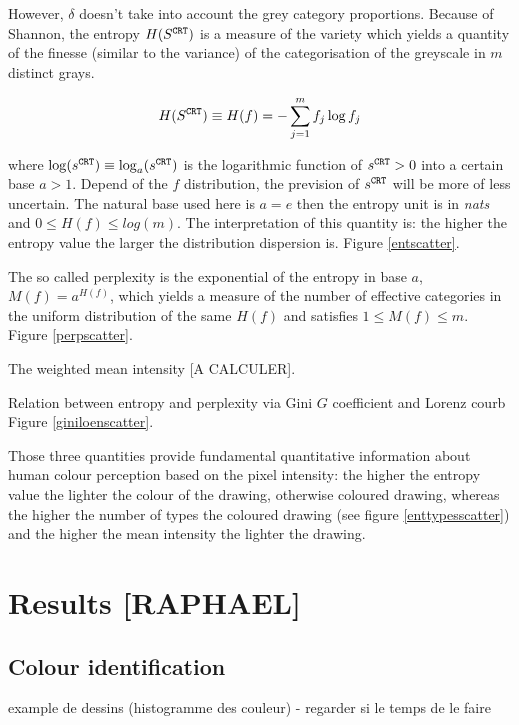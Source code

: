 \documentclass[11pt,a4paper]{article}
\begin{document}
However, \(\delta\) doesn't take into account the grey category
proportions. Because of Shannon, the entropy
\(H(S^{\tt \scriptstyle CRT})\) is a measure of the variety which yields
a quantity of the finesse (similar to the variance) of the
categorisation of the greyscale in \(m\) distinct grays.

\[ H(S^{\tt \scriptstyle CRT}) \equiv H(f) = -\sum_{j=1}^{m} f_j \log f_j \]

where
\(\log(s^{\tt \scriptstyle CRT}) \equiv \log_a(s^{\tt \scriptstyle CRT})\)
is the logarithmic function of \(s^{\tt \scriptstyle CRT} > 0\) into a
certain base \(a > 1\). Depend of the \(f\) distribution, the prevision
of \(s^{\tt \scriptstyle CRT}\) will be more of less uncertain. The
natural base used here is \(a = e\) then the entropy unit is in
\emph{nats} and \(0 \leq H(f) \leq log(m)\). The interpretation of this
quantity is: the higher the entropy value the larger the distribution
dispersion is. Figure \ref{entscatter}.

The so called perplexity is the exponential of the entropy in base
\(a\), \(M(f) = a^{H(f)}\), which yields a measure of the number of
effective categories in the uniform distribution of the same \(H(f)\)
and satisfies \(1 \leq M(f) \leq m\). Figure \ref{perpscatter}.

The weighted mean intensity {[}A CALCULER{]}.

Relation between entropy and perplexity via Gini \(G\) coefficient and
Lorenz courb Figure \ref{giniloenscatter}.

Those three quantities provide fundamental quantitative information
about human colour perception based on the pixel intensity: the higher
the entropy value the lighter the colour of the drawing, otherwise
coloured drawing, whereas the higher the number of types the coloured
drawing (see figure \ref{enttypesscatter}) and the higher the mean
intensity the lighter the drawing.



\section{Results [RAPHAEL]}

\subsection{Colour identification}
example de dessins
(histogramme des couleur) - regarder si le temps de le faire

\end{document}
